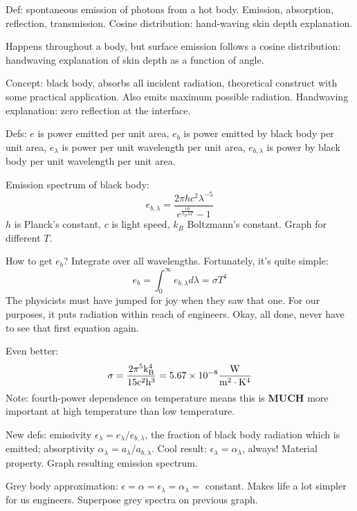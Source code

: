 \documentclass{report}
\begin{document}
Def: spontaneous emission of photons from a hot body.  Emission, absorption,
reflection, transmission.  Cosine distribution: hand-waving skin depth
explanation.

Happens throughout a body, but surface emission follows a cosine distribution:
handwaving explanation of skin depth as a function of angle.

Concept: black body, absorbs all incident radiation, theoretical construct with
some practical application.  Also emits maximum possible radiation.  Handwaving
explanation: zero reflection at the interface.

Defs: $e$ is power emitted per unit area, $e_b$ is power emitted by black body
per unit area, $e_\lambda$ is power per unit wavelength per unit area,
$e_{b,\lambda}$ is power by black body per unit wavelength per unit area.

Emission spectrum of black body:
$$e_{b,\lambda} =
\frac{2\pi h c^2 \lambda^{-5}}{e^{\frac{ch}{k_B\lambda T}} - 1}$$
$h$ is Planck's constant, $c$ is light speed, $k_B$ Boltzmann's constant.
Graph for different $T$.


How to get $e_b$?  Integrate over all wavelengths.  Fortunately, it's quite
simple:
$$e_b = \int_0^\infty e_{b,\lambda} d\lambda = \sigma T^4$$
The physicists must have jumped for joy when they saw that one.  For our
purposes, it puts radiation within reach of engineers.  Okay, all done, never
have to see that first equation again.

Even better:
$$\rm\sigma = \frac{2\pi^5k_B^4}{15c^2h^3} = 5.67\times10^{-8}\frac{W}{m^2\cdot
  K^4}$$
Note: fourth-power dependence on temperature means this is {\bf MUCH} more
important at high temperature than low temperature.

New defs: emissivity $\epsilon_\lambda = e_\lambda/e_{b,\lambda}$, the fraction
of black body radiation which is emitted; absorptivity $\alpha_\lambda =
a_\lambda/a_{b,\lambda}$.  Cool result: $\epsilon_\lambda = \alpha_\lambda$,
always!  Material property.  Graph resulting emission spectrum.

Grey body approximation: $\epsilon=\alpha=\epsilon_\lambda=\alpha_\lambda=$
constant.  Makes life a lot simpler for us engineers.  Superpose grey spectra
on previous graph.
\end{document}
